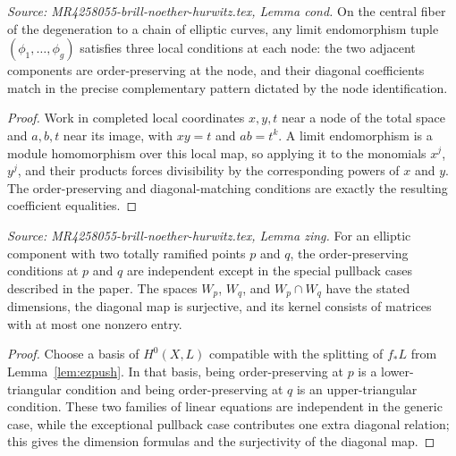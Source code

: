 \begin{lemma}
  \label{lem:cond}
  \textit{Source: MR4258055-brill-noether-hurwitz.tex, Lemma cond.}
  On the central fiber of the degeneration to a chain of elliptic curves, any limit endomorphism tuple \((\phi_1,\dots,\phi_g)\) satisfies three local conditions at each node: the two adjacent components are order-preserving at the node, and their diagonal coefficients match in the precise complementary pattern dictated by the node identification.
\end{lemma}

\begin{proof}
  Work in completed local coordinates \(x,y,t\) near a node of the total space and \(a,b,t\) near its image, with \(xy=t\) and \(ab=t^k\). A limit endomorphism is a module homomorphism over this local map, so applying it to the monomials \(x^j\), \(y^j\), and their products forces divisibility by the corresponding powers of \(x\) and \(y\). The order-preserving and diagonal-matching conditions are exactly the resulting coefficient equalities.
\end{proof}

\begin{lemma}
  \label{lem:zing}
  \textit{Source: MR4258055-brill-noether-hurwitz.tex, Lemma zing.}
  For an elliptic component with two totally ramified points \(p\) and \(q\), the order-preserving conditions at \(p\) and \(q\) are independent except in the special pullback cases described in the paper. The spaces \(W_p\), \(W_q\), and \(W_p\cap W_q\) have the stated dimensions, the diagonal map is surjective, and its kernel consists of matrices with at most one nonzero entry.
\end{lemma}

\begin{proof}
  Choose a basis of \(H^0(X,L)\) compatible with the splitting of \(f_*L\) from Lemma~\ref{lem:ezpush}. In that basis, being order-preserving at \(p\) is a lower-triangular condition and being order-preserving at \(q\) is an upper-triangular condition. These two families of linear equations are independent in the generic case, while the exceptional pullback case contributes one extra diagonal relation; this gives the dimension formulas and the surjectivity of the diagonal map.
\end{proof}

